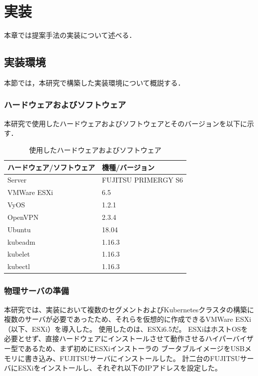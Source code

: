 \chapter{実装}
\label{implementation}

本章では提案手法の実装について述べる．

\section{実装環境}
\label{implementation:environment}
本節では，本研究で構築した実装環境について概説する．

\subsection{ハードウェアおよびソフトウェア}
\label{implementation:environment:resouces}

本研究で使用したハードウェアおよびソフトウェアとそのバージョンを以下に示す．

\begin{table}[htb]
  \begin{center}
    \caption{使用したハードウェアおよびソフトウェア}
    \begin{tabular}{|l|l|} \hline
      ハードウェア/ソフトウェア & 機種/バージョン \\ \hline
      Server & FUJITSU PRIMERGY S6 \\ \hline
      VMWare ESXi & 6.5 \\ \hline
      VyOS & 1.2.1 \\ \hline
      OpenVPN & 2.3.4 \\ \hline
      Ubuntu & 18.04 \\ \hline
      kubeadm & 1.16.3 \\ \hline
      kubelet & 1.16.3 \\ \hline
      kubectl & 1.16.3 \\ \hline
    \end{tabular}
  \end{center}
\end{table}

\subsection{物理サーバの準備}
\label{implementation:esxi}

本研究では、実装において複数のセグメントおよびKubernetesクラスタの構築に複数のサーバが必要であったため、それらを仮想的に作成できるVMWare ESXi（以下、ESXi）を導入した。
使用したのは、ESXi6.5だ。
ESXiはホストOSを必要とせず、直接ハードウェアにインストールさせて動作させるハイパーバイザー型であるため、まず初めにESXiインストーラの
ブータブルイメージをUSBメモリに書き込み、FUJITSUサーバにインストールした。
計二台のFUJITSUサーバにESXiをインストールし、それぞれ以下のIPアドレスを設定した。

